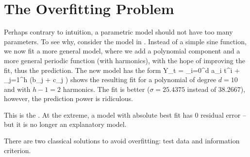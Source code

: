 \section{The Overfitting Problem}
Perhaps contrary to intuition, a parametric model
should not have too many parameters. To see why,
consider the model in .
Instead of a simple sine function, we now fit a more
general model, where we add a polynomial component and
a more general periodic function (with harmonics),
with the hope of improving the fit, thus the
prediction. The new model has the form
 \be Y_t = \sum_{i=0}^d a_i t^i + \sum_{j=1}^h \left(b_j\cos{}
   + c_j \sin{} \right)
   \label{eq-sprint-regress-a}
 \ee
{} shows the resulting fit
for a polynomial of degree $d=10$ and with $h-1=2$
harmonics. The fit is better ($\sigma=25.4375$ instead
of $38.2667$), however, the prediction power is
ridiculous.
\begin{figure}[!htbp]
\end{figure}
This is the . At the extreme,
a model with absolute best fit has $0$ residual error
-- but it is no longer an explanatory model.

There are two classical solutions to avoid overfitting: test
data and information criterion.
%
